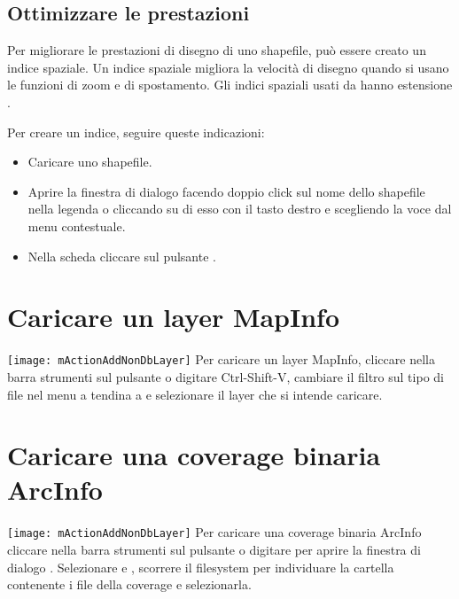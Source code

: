 \subsection{Ottimizzare le prestazioni}

Per migliorare le prestazioni di disegno di uno shapefile, può essere creato
un indice spaziale. Un  indice spaziale
migliora la velocità di disegno quando si usano le funzioni di zoom e di
spostamento. Gli indici spaziali usati da \qg hanno estensione .

Per creare un indice, seguire queste indicazioni:

\begin{itemize}[label=--]
\item Caricare uno shapefile.
\item Aprire la finestra di dialogo  facendo doppio click
sul nome dello shapefile nella legenda o cliccando su di esso con il tasto
destro e scegliendo la voce  dal menu contestuale.
\item Nella scheda  cliccare sul pulsante .
\end{itemize}

\section{Caricare un layer MapInfo}

\texttt{[image: mActionAddNonDbLayer]} Per caricare un layer MapInfo, 
cliccare nella barra strumenti sul pulsante  
o digitare {Ctrl-Shift-V}, cambiare il filtro sul tipo di file nel menu a tendina a
 e
selezionare il layer che si intende caricare.

\section{Caricare una coverage binaria ArcInfo}

\texttt{[image: mActionAddNonDbLayer]} Per caricare una coverage binaria
ArcInfo cliccare nella barra strumenti sul pulsante
 o digitare
 per aprire la finestra di dialogo . Selezionare  e , 
scorrere il filesystem per individuare la cartella contenente i file della coverage e selezionarla.

